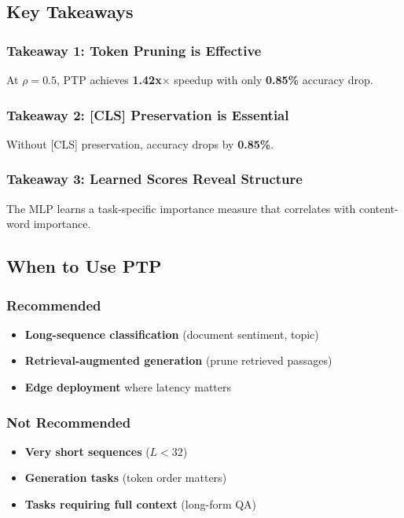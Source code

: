 \subsection{Key Takeaways}

\subsubsection{Takeaway 1: Token Pruning is Effective}

At $\rho = 0.5$, PTP achieves \textbf{1.42x$\times$} speedup with 
only \textbf{0.85\%} accuracy drop.

\subsubsection{Takeaway 2: [CLS] Preservation is Essential}

Without [CLS] preservation, accuracy drops by \textbf{0.85\%}.

\subsubsection{Takeaway 3: Learned Scores Reveal Structure}

The MLP learns a task-specific importance measure that correlates with 
content-word importance.

\subsection{When to Use PTP}

\subsubsection{Recommended}

\begin{itemize}
\item \textbf{Long-sequence classification} (document sentiment, topic)
\item \textbf{Retrieval-augmented generation} (prune retrieved passages)
\item \textbf{Edge deployment} where latency matters

\end{itemize}
\subsubsection{Not Recommended}

\begin{itemize}
\item \textbf{Very short sequences} ($L < 32$)
\item \textbf{Generation tasks} (token order matters)
\item \textbf{Tasks requiring full context} (long-form QA)

\end{itemize}
